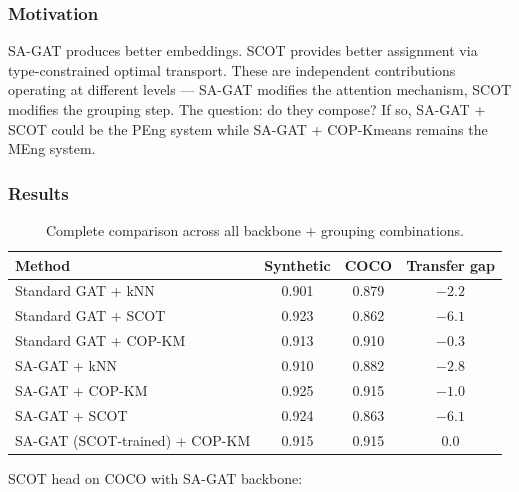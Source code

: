 \subsubsection{Motivation}

SA-GAT produces better embeddings. SCOT provides better assignment via type-constrained optimal transport. These are independent contributions operating at different levels --- SA-GAT modifies the attention mechanism, SCOT modifies the grouping step. The question: do they compose? If so, SA-GAT + SCOT could be the PEng system while SA-GAT + COP-Kmeans remains the MEng system.


\subsubsection{Results}

\begin{table}[H]
\centering
\footnotesize
\begin{tabular}{lccc}
\toprule
Method & Synthetic & COCO & Transfer gap \\
\midrule
Standard GAT + kNN & 0.901 & 0.879 & $-2.2$ \\
Standard GAT + SCOT & 0.923 & 0.862 & $-6.1$ \\
Standard GAT + COP-KM & 0.913 & 0.910 & $-0.3$ \\
\midrule
SA-GAT + kNN & 0.910 & 0.882 & $-2.8$ \\
SA-GAT + COP-KM & 0.925 & 0.915 & $-1.0$ \\
SA-GAT + SCOT & 0.924 & 0.863 & $-6.1$ \\
SA-GAT (SCOT-trained) + COP-KM & 0.915 & 0.915 & $0.0$ \\
\bottomrule
\end{tabular}
\caption{Complete comparison across all backbone + grouping combinations.}
\end{table}

SCOT head on COCO with SA-GAT backbone:

